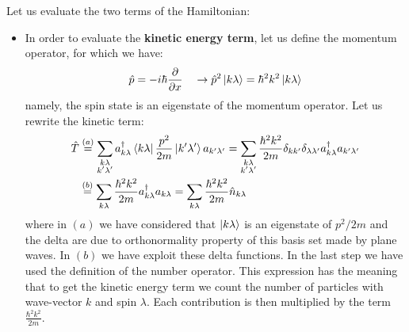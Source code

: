 \documentclass[11pt, a4paper, twoside, openright]{article}
\begin{document}
Let us evaluate the two terms of the Hamiltonian:
\begin{itemize}
\item In order to evaluate the \textbf{kinetic energy term}, let us define the momentum operator, for which we have:
\begin{equation*}
\hat{p} = - i \hbar \pdv{}{x} \quad \rightarrow  \hat{p}^2 \ket{k \lambda } = \hbar ^2 k^2  \ket{k \lambda }
\end{equation*}
namely, the spin state is an eigenstate of the momentum operator.
Let us rewrite the kinetic term:
\begin{equation*}
\begin{split}
 \hat{T}   & \overset{(a)}{=}  \sum_{\substack{k \lambda  \\ k' \lambda' } }^{}   a_{k \lambda } ^\dag \bra{k \lambda } \frac{p^2}{2m} \ket{k' \lambda'} a_{k' \lambda'}
 = \sum_{\substack{k \lambda  \\ k' \lambda' } }^{} \frac{\hbar ^2k^2}{2m} \delta _{k k'} \delta _{\lambda \lambda'} a_{k \lambda } ^\dag a_{k'\lambda '}\\
 &\overset{(b)}{=} \sum_{k \lambda }^{} \frac{\hbar ^2 k^2}{2m} a_{k\lambda }^\dag a_{k\lambda }= \sum_{k \lambda }^{} \frac{\hbar ^2 k^2}{2m} \hat{n}_{k \lambda }
\end{split}
\end{equation*}
where in \( (a) \) we have considered that \( \ket{k \lambda }  \) is an eigenstate of \( p^2/2m \) and the delta are due to orthonormality property of this basis set made by plane waves. In \( (b) \) we have exploit these delta functions. In the last step we have used the definition of the number operator.
This expression has the meaning that to get the kinetic energy term we count the number of particles with wave-vector \( k \) and spin \( \lambda  \). Each contribution is then multiplied by the term \( \frac{\hbar ^2 k^2}{2m}  \).


\end{itemize}
\end{document}
